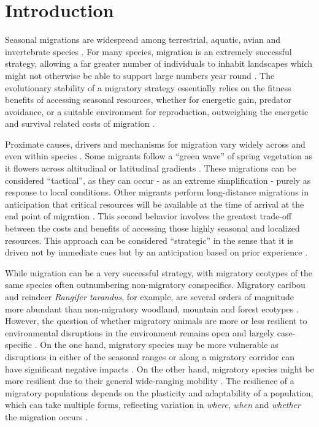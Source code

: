 \documentclass[utf8]{frontiersSCNS} %
\begin{document}
\section{Introduction}
	
	Seasonal migrations are widespread among terrestrial, aquatic, avian and invertebrate species \citep{Dingle2014}. For many species, migration is an extremely successful strategy, allowing a far greater number of individuals to inhabit landscapes which might not otherwise be able to support large numbers year round \citep{Fryxell1988}. The evolutionary stability of a migratory strategy essentially relies on the fitness benefits of accessing seasonal resources, whether for energetic gain, predator avoidance, or a suitable  environment for reproduction, outweighing the energetic and survival related costs of migration \citep{Avgar2014}. 
	
	Proximate causes, drivers and mechanisms for migration vary widely across and even within species \citep{Berthold1999, Shaw2016}. Some migrants follow a ``green wave'' of spring vegetation as it flowers across altitudinal or latitudinal gradients \citep{Bischof2012, Kolzsch2015, Merkle2016}. These migrations can be considered ``tactical'', as they can occur - as an extreme simplification - purely as response to local conditions. Other migrants perform long-distance migrations in anticipation that critical resources will be available at the time of arrival at the end point of migration \citep{Abrahms2019}. This second behavior involves the greatest trade-off between the costs and benefits of accessing those highly seasonal and localized resources. This approach can be considered ``strategic'' in the sense that it is driven not by immediate cues but by an anticipation based on prior experience \citep{Bracis2017, Merkle2019, Bauer2020}. 

	While migration can be a very successful strategy, with migratory ecotypes of the same species often outnumbering non-migratory conspecifics.  Migratory caribou and reindeer \emph{Rangifer tarandus}, for example, are several orders of magnitude more abundant than non-migratory woodland, mountain and forest ecotypes \citep{FestaBianchet2011,Uboni2016}. However, the question of whether migratory animals are more or less resilient to environmental disruptions in the environment remains open and largely case-specific \citep{Moore2008, HardestyMoore2017, Xu2021}. On the one hand, migratory species may be more vulnerable as disruptions in either of the seasonal ranges or along a migratory corridor can have significant negative impacts \citep{Wilcove2008, Seebacher2015, Kauffman2021}. On the other hand, migratory species might be more resilient due to their general wide-ranging mobility \citep{Robinson2009}. The resilience of a migratory populations depends on the plasticity and adaptability of a population, which can take multiple forms, reflecting variation in \textit{where}, \textit{when} and \textit{whether} the migration occurs \citep{Gurarie2017, Xu2021}. 
	
\end{document}

